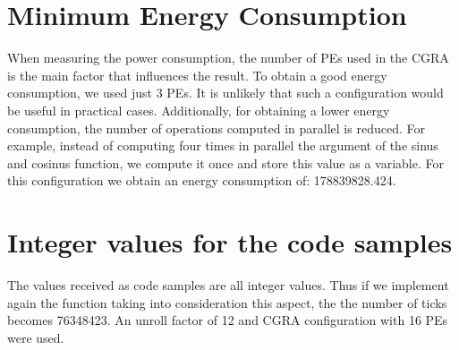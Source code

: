 	\section{Minimum Energy Consumption} %
	\label{sec:impl_min_energy}
		When measuring the power consumption, the number of PEs used in the CGRA is the main factor that influences the result. To obtain a good energy consumption, we used just 3 PEs. It is unlikely that such a configuration would be useful in practical cases. Additionally, for obtaining a lower energy consumption, the number of operations computed in parallel is reduced. For example, instead of computing four times in parallel the argument of the sinus and cosinus function, we compute it once and store this value as a variable. For this configuration we obtain an energy consumption of: 178839828.424.
	
	\section{Integer values for the code samples} %
	\label{sec:impl_min_energy}
		The values received as code samples are all integer values. Thus if we implement again the function taking into consideration this aspect, the the number of ticks becomes 76348423. An unroll factor of 12 and CGRA configuration with 16 PEs were used. 
